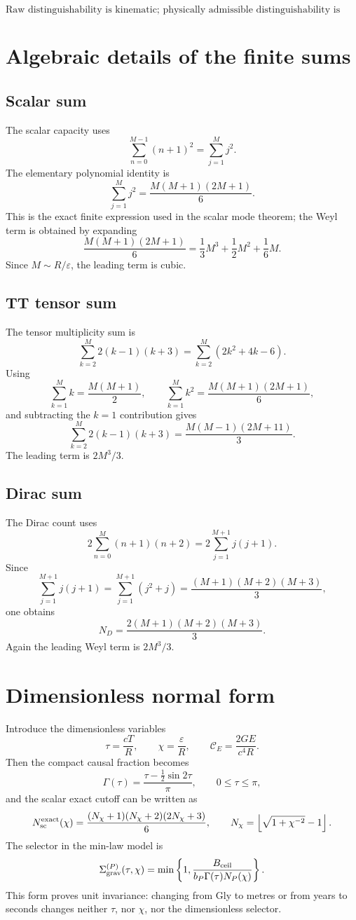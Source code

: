 \documentclass[11pt,a4paper]{article}
\begin{document}
\[
\boxed{\text{Raw distinguishability is kinematic; physically admissible distinguishability is selected.}}
\]

\appendix

\section{Algebraic details of the finite sums}

\subsection{Scalar sum}
The scalar capacity uses
\[
\sum_{n=0}^{M-1}(n+1)^2=\sum_{j=1}^{M}j^2.
\]
The elementary polynomial identity is
\[
\sum_{j=1}^{M}j^2=\frac{M(M+1)(2M+1)}{6}.
\]
This is the exact finite expression used in the scalar mode theorem; the Weyl term is obtained by expanding
\[
\frac{M(M+1)(2M+1)}{6}=\frac{1}{3}M^3+\frac12M^2+\frac16M.
\]
Since $M\sim R/\varepsilon$, the leading term is cubic.

\subsection{TT tensor sum}
The tensor multiplicity sum is
\[
\sum_{k=2}^{M}2(k-1)(k+3)
=\sum_{k=2}^{M}(2k^2+4k-6).
\]
Using
\[
\sum_{k=1}^{M}k=\frac{M(M+1)}{2},\qquad
\sum_{k=1}^{M}k^2=\frac{M(M+1)(2M+1)}{6},
\]
and subtracting the $k=1$ contribution gives
\[
\sum_{k=2}^{M}2(k-1)(k+3)
=\frac{M(M-1)(2M+11)}{3}.
\]
The leading term is $2M^3/3$.

\subsection{Dirac sum}
The Dirac count uses
\[
2\sum_{n=0}^{M}(n+1)(n+2)=2\sum_{j=1}^{M+1}j(j+1).
\]
Since
\[
\sum_{j=1}^{M+1}j(j+1)=\sum_{j=1}^{M+1}(j^2+j)
=\frac{(M+1)(M+2)(M+3)}{3},
\]
one obtains
\[
N_D=\frac{2(M+1)(M+2)(M+3)}{3}.
\]
Again the leading Weyl term is $2M^3/3$.

\section{Dimensionless normal form}

Introduce the dimensionless variables
\[
\tau=\frac{cT}{R},\qquad
\chi=\frac{\varepsilon}{R},\qquad
\mathcal C_E=\frac{2GE}{c^4R}.
\]
Then the compact causal fraction becomes
\[
\Gamma(\tau)=\frac{\tau-\frac12\sin2\tau}{\pi},
\qquad 0\le \tau\le\pi,
\]
and the scalar exact cutoff can be written as
\[
N_{\rm sc}^{\rm exact}(\chi)=
\frac{(N_\chi+1)(N_\chi+2)(2N_\chi+3)}{6},
\qquad
N_\chi=\left\lfloor\sqrt{1+\chi^{-2}}-1\right\rfloor.
\]
The selector in the min-law model is
\[
\Sigma_{\rm grav}^{(P)}(\tau,\chi)=
\min\left\{1,\frac{B_{\rm ceil}}{b_P\Gamma(\tau)N_P(\chi)}\right\}.
\]
This form proves unit invariance: changing from Gly to metres or from years to seconds changes neither $\tau$, nor $\chi$, nor the dimensionless selector.
\end{document}
